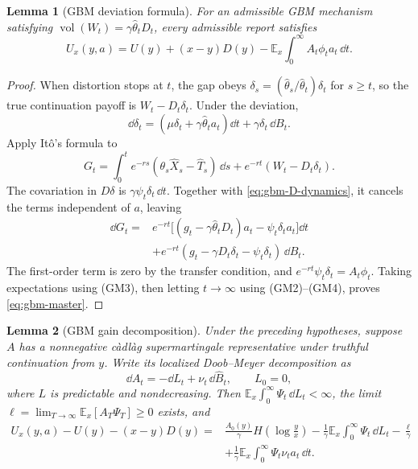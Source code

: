 \documentclass[12pt]{article}
\newtheorem{lemma}{Lemma}
\DeclareMathOperator{\vol}{vol}
\newcommand{\E}{\mathbb{E}}
\newcommand{\hth}{\hat\theta}
\newcommand{\hB}{\hat B}
\begin{document}
\begin{lemma}[GBM deviation formula]\label{lem:gbm-master}
For an admissible GBM mechanism satisfying
\(\vol(W_t)=\gamma\hth_tD_t\), every admissible report satisfies
\begin{equation}\label{eq:gbm-master}
  U_x(y,a)
   =U(y)+(x-y)D(y)
     -\E_x\int_0^\infty A_t\phi_ta_t\,\dd t.
\end{equation}
\end{lemma}

\begin{proof}
When distortion stops at \(t\), the gap obeys
\(\delta_s=(\hth_s/\hth_t)\delta_t\) for \(s\geq t\), so the
true continuation payoff is \(W_t-D_t\delta_t\). Under the
deviation,
\[
  \dd\delta_t=(\mu\delta_t+\gamma\hth_ta_t)\dd t
                 +\gamma\delta_t\,\dd B_t.
\]
Apply It\^o's formula to
\[
  G_t=\int_0^t e^{-rs}
      (\theta_s\widehat X_s-\widehat T_s)\,\dd s
       +e^{-rt}(W_t-D_t\delta_t).
\]
The covariation in \(D\delta\) is
\(\gamma\psi_t\delta_t\,\dd t\). Together with
\eqref{eq:gbm-D-dynamics}, it cancels the terms independent of
\(a\), leaving
\begin{equation}\label{eq:transfer-first-gbm}
\begin{aligned}
  \dd G_t
   ={}&e^{-rt}\bigl[(g_t-\gamma\hth_tD_t)a_t
                    -\psi_t\delta_ta_t\bigr]\dd t
     \\
     &+e^{-rt}(g_t-\gamma D_t\delta_t-\psi_t\delta_t)\,\dd B_t.
\end{aligned}
\end{equation}
The first-order term is zero by the transfer condition, and
\(e^{-rt}\psi_t\delta_t=A_t\phi_t\). Taking expectations using
(GM3), then letting \(t\to\infty\) using (GM2)--(GM4), proves
\eqref{eq:gbm-master}.
\end{proof}

\begin{lemma}[GBM gain decomposition]\label{lem:gbm-gain}
Under the preceding hypotheses, suppose \(A\) has a nonnegative
c\`adl\`ag supermartingale representative under truthful continuation
from \(y\). Write its localized Doob--Meyer decomposition as
\[
  \dd A_t=-\dd L_t+\nu_t\,\dd\hB_t,
  \qquad L_0=0,
\]
where \(L\) is predictable and nondecreasing. Then
\(\E_x\int_0^\infty\Psi_t\,\dd L_t<\infty\), the limit
\(\ell=\lim_{T\to\infty}\E_x[A_T\Psi_T]\geq0\) exists, and
\begin{equation}\label{eq:gbm-gain}
\begin{aligned}
  U_x(y,a)-U(y)-(x-y)D(y)
   ={}&\frac{A_0(y)}\gamma H\!\left(\log\frac yx\right)
      -\frac1\gamma\E_x\int_0^\infty\Psi_t\,\dd L_t
      -\frac\ell\gamma\\
     &+\frac1\gamma\E_x\int_0^\infty\Psi_t\nu_ta_t\,\dd t.
\end{aligned}
\end{equation}
\end{lemma}
\end{document}
